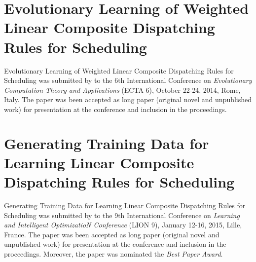 

\section[ECTA6]{Evolutionary Learning of Weighted Linear Composite Dispatching 
Rules for Scheduling}\label{app:ecta6}
Evolutionary Learning of Weighted Linear Composite Dispatching Rules for 
Scheduling was submitted by \citeauthor{InRu14} to the 6th International 
Conference on \emph{Evolutionary Computation Theory and Applications} (ECTA 6), 
October 22-24, 2014, Rome, Italy. 
The paper was been accepted as long paper (original novel and unpublished work) 
for presentation at the conference and inclusion in the proceedings. 



\section[LION9]{Generating Training Data for Learning Linear Composite 
Dispatching Rules for Scheduling}\label{app:lion9}
Generating Training Data for Learning Linear Composite Dispatching Rules for 
Scheduling was submitted by \citeauthor{InRu15a} to the 9th International 
Conference on \emph{Learning and Intelligent OptimizatioN Conference} (LION 9), 
January 12-16, 2015, Lille, France. 
The paper was been accepted as long paper (original novel and unpublished work) 
for presentation at the conference and inclusion in the proceedings. 
Moreover, the paper was nominated the \emph{Best Paper Award}.


